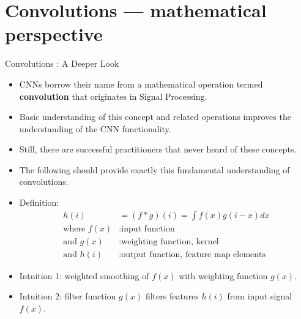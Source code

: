 
 







\section{Convolutions --- mathematical perspective}

\begin{vbframe}{Convolutions : A Deeper Look}
    \begin{itemize}
        \item CNNs borrow their name from a mathematical operation termed \textbf{convolution} that originates in Signal Processing.
        \item Basic understanding of this concept and related operations improves the understanding of the CNN functionality.
        \item Still, there are successful practitioners that never heard of these concepts.
        \item The following should provide exactly this fundamental understanding of convolutions.
    \end{itemize}
\framebreak
    \begin{itemize}
        \item Definition: \\
            \begin{equation*}
                \begin{split}
                    h(i) &= (f \ast g)(i) = \int f(x)g(i-x)dx \\
                    \text{where } f(x)&: \text{input function} \\
                    \text{and } g(x)&: \text{weighting function, kernel} \\
                    \text{and } h(i)&: \text{output function, feature map elements}
                \end{split}
            \end{equation*}
        \item Intuition 1: weighted smoothing of $f(x)$ with weighting function $g(x)$. 
        \item Intuition 2: filter function $g(x)$ filters features $h(i)$ from input signal $f(x)$.
    \end{itemize}
\end{vbframe}    

